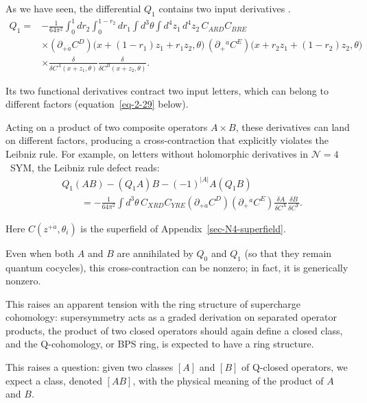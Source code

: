\documentclass[11pt]{article}
\numberwithin{equation}{section}
\numberwithin{figure}{section}
\numberwithin{table}{section}
\begin{document}
As we have seen, the differential $Q_1$ contains two input derivatives \cite{BK}.
\begin{equation}\label{eq-2-16}
\begin{aligned}
Q_1={}&-\frac{1}{64\pi^2}
\int_0^1dr_2\int_0^{1-r_2}dr_1\int d^3\theta\int d^4z_1\,d^4z_2\,
C_{ARD}C_{BRE}\\
&\times(\partial_{+\dot a}C^D)
\big(x+(1-r_1)z_1+r_1z_2,\theta\big)\,
(\partial_+{}^{\dot a}C^E)
\big(x+r_2z_1+(1-r_2)z_2,\theta\big)\\
&\times\frac{\delta}{\delta C^A(x+z_1,\theta)}
\frac{\delta}{\delta C^B(x+z_2,\theta)}.
\end{aligned}
\end{equation}

Its two functional derivatives contract two input letters, which can belong to different factors (equation~\eqref{eq-2-29} below).

Acting on a product of two composite operators $A\times B$, these derivatives can land on different factors, producing a cross-contraction that explicitly violates the Leibniz rule. For example, on letters without holomorphic derivatives in $\mathcal N=4$~SYM, the Leibniz rule defect reads:
\begin{equation}\label{eq-2-29}
\begin{aligned}
&Q_1(AB)-(Q_1A)B-(-1)^{|A|}A(Q_1B)\\
&\qquad=-\frac1{64\pi^2}\int d^3\theta\,
C_{XRD}C_{YRE}
(\partial_{+\dot a}C^D)(\partial_+{}^{\dot a}C^E)
\frac{\delta A}{\delta C^X}\frac{\delta B}{\delta C^Y}.
\end{aligned}
\end{equation}

Here $C(z^{+\dot a}, \theta_i)$ is the superfield of Appendix~\ref{sec-N4-superfield}.

Even when both $A$ and $B$ are annihilated by $Q_0$ and $Q_1$ (so that they remain quantum cocycles), this cross-contraction can be nonzero; in fact, it is generically nonzero.

This raises an apparent tension with the ring structure of supercharge cohomology: supersymmetry acts as a graded derivation on separated operator products, the product of two closed operators should again define a closed class, and the Q-cohomology, or BPS ring, is expected to have a ring structure.

This raises a question: given two classes $[A]$ and $[B]$ of Q-closed operators, we expect a class, denoted $[AB]$, with the physical meaning of the product of $A$ and $B$.
\end{document}

